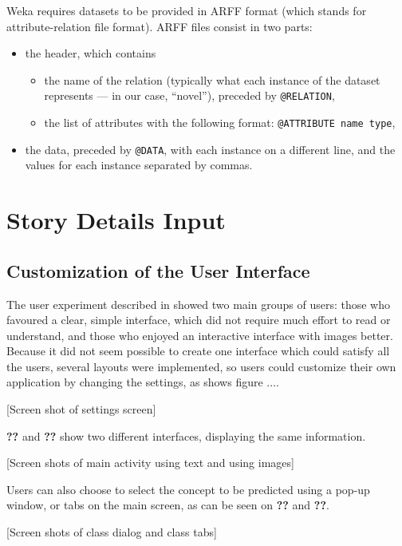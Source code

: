\documentclass{mproj}
\begin{document}
Weka requires datasets to be provided in ARFF format (which stands for attribute-relation file format). \cite{arff} ARFF files consist in two parts:
\begin{itemize}[topsep=0pt]
	\item the header, which contains 
	\begin{itemize}
		\item the name of the relation (typically what each instance of the dataset represents --- in our case, ``novel''), preceded by \verb|@RELATION|,
		\item the list of attributes with the following format: \verb|@ATTRIBUTE name type|,
	\end{itemize}
	\item the data, preceded by \verb|@DATA|, with each instance on a different line, and the values for each instance separated by commas.
\end{itemize}

\section{Story Details Input}

\subsection*{Customization of the User Interface}

The user experiment described in  showed two main groups of users: those who favoured a clear, simple interface, which did not require much effort to read or understand, and those who enjoyed an interactive interface with images better. Because it did not seem possible to create one interface which could satisfy all the users, several layouts were implemented, so users could customize their own application by changing the settings, as shows figure ....

[Screen shot of settings screen]

\textbf{??} and \textbf{??} show two different interfaces, displaying the same information.

[Screen shots of main activity using text and using images]

Users can also choose to select the concept to be predicted using a pop-up window, or tabs on the main screen, as can be seen on \textbf{??} and \textbf{??}.

[Screen shots of class dialog and class tabs]
\end{document}
